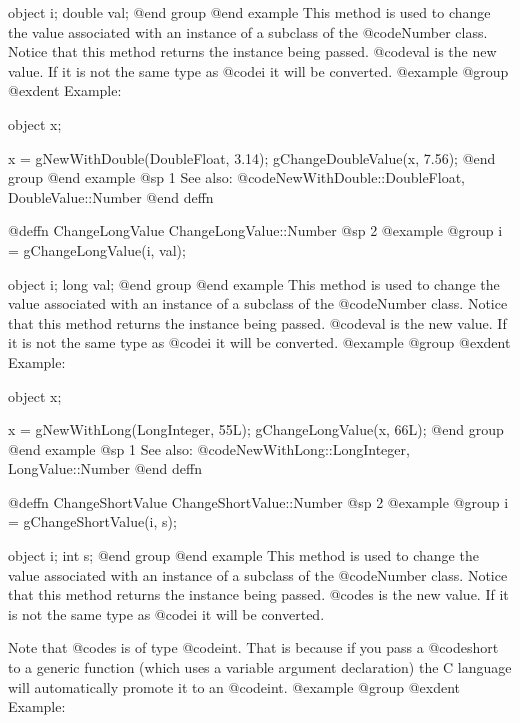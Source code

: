 object  i;
double  val;
@end group
@end example
This method is used to change the value associated with an instance of
a subclass of the @code{Number} class.  Notice that this method
returns the instance being passed.  @code{val} is the new value.
If it is not the same type as @code{i} it will be converted.
@example
@group
@exdent Example:

object  x;

x = gNewWithDouble(DoubleFloat, 3.14);
gChangeDoubleValue(x, 7.56);
@end group
@end example
@sp 1
See also:  @code{NewWithDouble::DoubleFloat, DoubleValue::Number}
@end deffn














@deffn {ChangeLongValue} ChangeLongValue::Number
@sp 2
@example
@group
i = gChangeLongValue(i, val);

object  i;
long    val;
@end group
@end example
This method is used to change the value associated with an instance of
a subclass of the @code{Number} class.  Notice that this method
returns the instance being passed.  @code{val} is the new value.
If it is not the same type as @code{i} it will be converted.
@example
@group
@exdent Example:

object  x;

x = gNewWithLong(LongInteger, 55L);
gChangeLongValue(x, 66L);
@end group
@end example
@sp 1
See also:  @code{NewWithLong::LongInteger, LongValue::Number}
@end deffn










@deffn {ChangeShortValue} ChangeShortValue::Number
@sp 2
@example
@group
i = gChangeShortValue(i, s);

object  i;
int     s;
@end group
@end example
This method is used to change the value associated with an instance of
a subclass of the @code{Number} class.  Notice that this method
returns the instance being passed.  @code{s} is the new value.
If it is not the same type as @code{i} it will be converted.

Note that @code{s} is of type @code{int}.  That is because if you pass a
@code{short} to a generic function (which uses a variable argument
declaration) the C language will automatically promote it to an
@code{int}.
@example
@group
@exdent Example:

